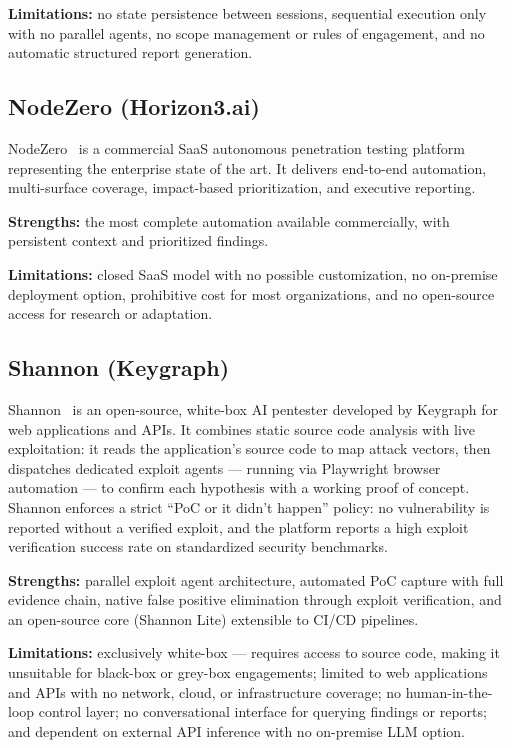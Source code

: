 \documentclass[12pt,a4paper]{report}
\begin{document}
\textbf{Limitations:} no state persistence between sessions, sequential execution
only with no parallel agents, no scope management or rules of engagement, and no
automatic structured report generation.

\subsection{NodeZero (Horizon3.ai)}

NodeZero~\cite{nodezero} is a commercial SaaS autonomous penetration testing platform
representing the enterprise state of the art. It delivers end-to-end automation,
multi-surface coverage, impact-based prioritization, and executive reporting.

\textbf{Strengths:} the most complete automation available commercially, with
persistent context and prioritized findings.

\textbf{Limitations:} closed SaaS model with no possible customization, no
on-premise deployment option, prohibitive cost for most organizations, and no
open-source access for research or adaptation.

\subsection{Shannon (Keygraph)}

Shannon~\cite{shannon} is an open-source, white-box AI pentester developed by
Keygraph for web applications and APIs. It combines static source code analysis
with live exploitation: it reads the application's source code to map attack vectors,
then dispatches dedicated exploit agents --- running via Playwright browser automation
--- to confirm each hypothesis with a working proof of concept. Shannon enforces a
strict ``PoC or it didn't happen'' policy: no vulnerability is reported without a
verified exploit, and the platform reports a high exploit verification success rate
on standardized security benchmarks.

\textbf{Strengths:} parallel exploit agent architecture, automated PoC capture with
full evidence chain, native false positive elimination through exploit verification,
and an open-source core (Shannon Lite) extensible to CI/CD pipelines.

\textbf{Limitations:} exclusively white-box --- requires access to source code,
making it unsuitable for black-box or grey-box engagements; limited to web
applications and APIs with no network, cloud, or infrastructure coverage; no
human-in-the-loop control layer; no conversational interface for querying findings
or reports; and dependent on external API inference with no on-premise LLM option.
\end{document}
